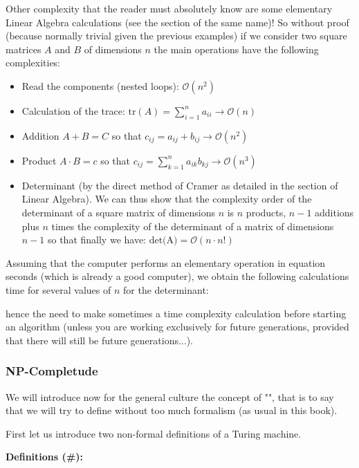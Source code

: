 Other complexity that the reader must absolutely know are some elementary Linear Algebra calculations (see the section of the same name)! So without proof (because normally trivial given the previous examples) if we consider two square matrices $A$ and $B$ of dimensions $n$ the main operations have the following complexities:
	\begin{itemize}
		\item Read the components (nested loops): $\mathcal{O}(n^2)$
		\item Calculation of the trace: $\text{tr}(A)=\displaystyle\sum_{i=1}^{n}a_{ii}\rightarrow \mathcal{O}(n)$ 
		\item Addition $A+B=C$ so that $c_{ij}=a_{ij}+b_{ij}\rightarrow \mathcal{O}(n^2)$
		\item Product $A\cdot B=c$ so that $c_{ij}=\displaystyle\sum_{k=1}^na_{ik}b_{kj}\rightarrow \mathcal{O}(n^3)$
		\item Determinant (by the direct method of Cramer as detailed in the section of Linear Algebra). We can thus show that the complexity order of the determinant of a square matrix of dimensions $n$ is $n$ products, $n-1$ additions plus $n$ times the complexity of the determinant of a matrix of dimensions $n-1$ so that finally we have: $\text{det(A)}=\mathcal{O}(n\cdot n!)$
	\end{itemize}
Assuming that the computer performs an elementary operation in equation seconds (which is already a good computer), we obtain the following calculations time for several values of $n$ for the determinant:

		
hence the need to make sometimes a time complexity calculation before starting an algorithm (unless you are working exclusively for future generations, provided that there will still be future generations...).

\subsubsection{NP-Completude}

We will introduce now for the general culture the concept of "", that is to say that we will try to define without too much formalism (as usual in this book).

First let us introduce two non-formal definitions of a Turing machine.

\textbf{Definitions (\#\mydef):}

